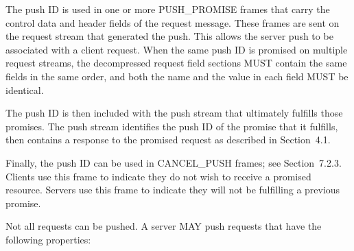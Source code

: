 \documentclass{article}
\begin{document}
The push ID is used in one or more PUSH\_PROMISE frames that carry the control data and header fields of the request message.  These frames are sent on the request stream that generated the push.  This allows the server push to be associated with a client request.  When the same push ID is promised on multiple request streams, the decompressed request field sections MUST contain the same fields in the same order, and both the name and the value in each field MUST be identical.

The push ID is then included with the push stream that ultimately fulfills those promises.  The push stream identifies the push ID of the promise that it fulfills, then contains a response to the promised request as described in Section~4.1.

Finally, the push ID can be used in CANCEL\_PUSH frames; see Section~7.2.3.  Clients use this frame to indicate they do not wish to receive a promised resource.  Servers use this frame to indicate they will not be fulfilling a previous promise.

Not all requests can be pushed.  A server MAY push requests that have the following properties:
\end{document}
